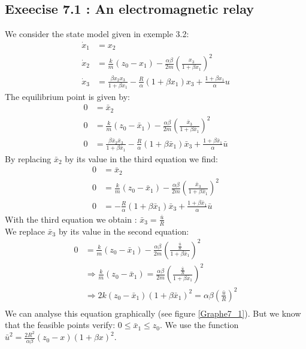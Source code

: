 \subsection*{Exeecise 7.1 : An electromagnetic relay}
We consider the state model given in exemple 3.2:
\begin{align*}
\dot{x}_1 &= x_2 \\
\dot{x}_2 &= \frac{k}{m}(z_0-x_1) - \frac{\alpha \beta}{2m} \left( \frac{x_3}{1+\beta x_1} \right)^2 \\
\dot{x}_3 &= \frac{\beta x_2 x_3}{1+\beta x_1} - \frac{R}{\alpha} (1+\beta x_1)x_3 + \frac{1+\beta x_1}{\alpha} u
\end{align*}
The equilibrium point is given by:
\begin{align*}
0 &=  \bar{x}_2 \\
0 &= \frac{k}{m}(z_0-\bar{x}_1) - \frac{\alpha \beta}{2m} \left( \frac{\bar{x}_3}{1+\beta \bar{x}_1} \right)^2 \\
0 &= \frac{\beta \bar{x}_2 \bar{x}_3}{1+\beta \bar{x}_1} - \frac{R}{\alpha} (1+\beta \bar{x}_1)\bar{x}_3 + \frac{1+\beta \bar{x}_1}{\alpha} \bar{u}
\end{align*}
By replacing $\bar{x}_2$ by its value in the third equation we find: 
\begin{align*}
0 &=  \bar{x}_2 \\
0 &= \frac{k}{m}(z_0-\bar{x}_1) - \frac{\alpha \beta}{2m} \left( \frac{\bar{x}_3}{1+\beta \bar{x}_1} \right)^2 \\
0 &=  -\frac{R}{\alpha} (1+\beta \bar{x}_1)\bar{x}_3 + \frac{1+\beta \bar{x}_1}{\alpha} \bar{u}
\end{align*}
With the third equation we obtain : $\bar{x}_3 = \frac{\bar{u}}{R}$\\
We replace $\bar{x}_3$ by its value in the second equation:
\begin{align*}
0 &= \frac{k}{m}(z_0-\bar{x}_1) - \frac{\alpha \beta}{2m} \left( \frac{\frac{\bar{u}}{R}}{1+\beta \bar{x}_1} \right)^2 \\
&\Rightarrow  \frac{k}{m}(z_0-\bar{x}_1) = \frac{\alpha \beta}{2m} \left( \frac{\frac{\bar{u}}{R}}{1+\beta \bar{x}_1} \right)^2 \\
&\Rightarrow  2k(z_0-\bar{x}_1) (1+\beta \bar{x}_1)^2 = \alpha \beta \left( \frac{\bar{u}}{R} \right)^2  \\
\end{align*}
We can analyse this equation graphically (see figure \ref{Graphe7_1}). But we know that the feasible points verify: $0 \le \bar{x}_1 \le z_0$. 
We use the function $\bar{u}^2 = \frac{2R^2}{\alpha \beta} (z_0-x)(1+\beta x)^2 $.
